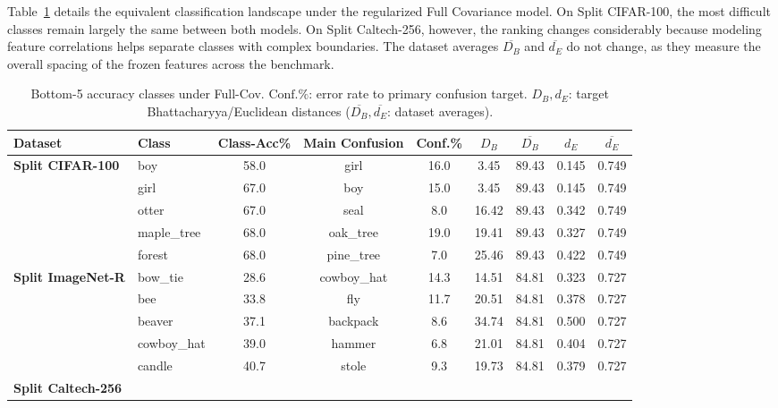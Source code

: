 Table~\ref{tab:worst_full} details the equivalent classification landscape under the regularized Full Covariance model. On Split CIFAR-100, the most difficult classes remain largely the same between both models. On Split Caltech-256, however, the ranking changes considerably because modeling feature correlations helps separate classes with complex boundaries. The dataset averages $\overline{D_B}$ and $\overline{d_E}$ do not change, as they measure the overall spacing of the frozen features across the benchmark.

\begin{table}[htbp]
	\centering
	\small
	\caption{Bottom-5 accuracy classes under Full-Cov. $\text{Conf.}\%$: error rate to primary confusion target. $D_B, d_E$: target Bhattacharyya/Euclidean distances ($\overline{D_B}, \overline{d_E}$: dataset averages).}
	\label{tab:worst_full}
	\begin{adjustbox}{width=0.95\columnwidth, center}
		\small
		\begin{tabular}{llccccccc}
			\toprule
			\textbf{Dataset} & \textbf{Class} & \textbf{Class-Acc\%} & \textbf{Main Confusion} & \textbf{Conf.\%} & $D_B$ & $\overline{D_B}$ & $d_E$ & $\overline{d_E}$ \\
			\midrule
			\textbf{Split CIFAR-100}
			& boy           & 58.0 & girl        & 16.0 &    3.45 & 89.43 & 0.145 & 0.749 \\
			& girl          & 67.0 & boy         & 15.0 &    3.45 & 89.43 & 0.145 & 0.749 \\
			& otter         & 67.0 & seal        &   8.0 & 16.42 & 89.43 & 0.342 & 0.749 \\
			& maple\_tree   & 68.0 & oak\_tree   & 19.0 & 19.41 & 89.43 & 0.327 & 0.749 \\
			& forest        & 68.0 & pine\_tree  &   7.0 & 25.46 & 89.43 & 0.422 & 0.749 \\
			\midrule
			\textbf{Split ImageNet-R}
			& bow\_tie      & 28.6 & cowboy\_hat & 14.3 & 14.51 & 84.81 & 0.323 & 0.727 \\
			& bee           & 33.8 & fly         & 11.7 & 20.51 & 84.81 & 0.378 & 0.727 \\
			& beaver        & 37.1 & backpack    &   8.6 & 34.74 & 84.81 & 0.500 & 0.727 \\
			& cowboy\_hat   & 39.0 & hammer      &   6.8 & 21.01 & 84.81 & 0.404 & 0.727 \\
			& candle        & 40.7 & stole       &   9.3 & 19.73 & 84.81 & 0.379 & 0.727 \\
			\midrule
			\textbf{Split Caltech-256}

\end{tabular}
\end{adjustbox}
\end{table}
